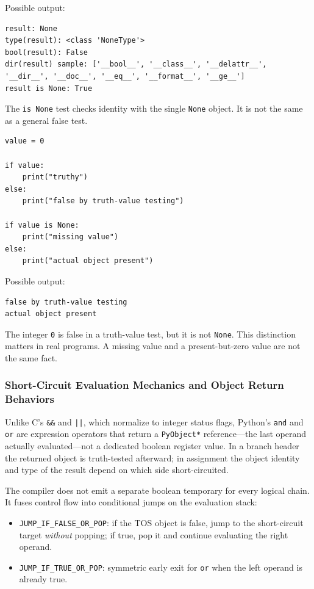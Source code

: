 Possible output:

\begin{verbatim}
result: None
type(result): <class 'NoneType'>
bool(result): False
dir(result) sample: ['__bool__', '__class__', '__delattr__', '__dir__', '__doc__', '__eq__', '__format__', '__ge__']
result is None: True
\end{verbatim}

The \texttt{is None} test checks identity with the single \texttt{None} object. It is not the same as a general false test.

\begin{verbatim}
value = 0

if value:
    print("truthy")
else:
    print("false by truth-value testing")

if value is None:
    print("missing value")
else:
    print("actual object present")
\end{verbatim}

Possible output:

\begin{verbatim}
false by truth-value testing
actual object present
\end{verbatim}

The integer \texttt{0} is false in a truth-value test, but it is not \texttt{None}. This distinction matters in real programs. A missing value and a present-but-zero value are not the same fact.

\subsubsection{Short-Circuit Evaluation Mechanics and Object Return Behaviors}

Unlike C's \texttt{\&\&} and \texttt{||}, which normalize to integer status flags, Python's \texttt{and} and \texttt{or} are expression operators that return a \texttt{PyObject*} reference---the last operand actually evaluated---not a dedicated boolean register value. In a branch header the returned object is truth-tested afterward; in assignment the object identity and type of the result depend on which side short-circuited.

The compiler does not emit a separate boolean temporary for every logical chain. It fuses control flow into conditional jumps on the evaluation stack:

\begin{itemize}
    \item \texttt{JUMP\_IF\_FALSE\_OR\_POP}: if the TOS object is false, jump to the short-circuit target \emph{without} popping; if true, pop it and continue evaluating the right operand.
    \item \texttt{JUMP\_IF\_TRUE\_OR\_POP}: symmetric early exit for \texttt{or} when the left operand is already true.
\end{itemize}


